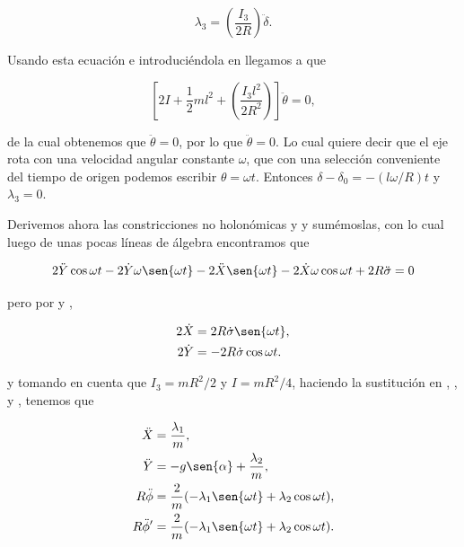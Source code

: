 \documentclass[a4paper,10pt]{article}
\numberwithin{equation}{section}
\begin{document}
\begin{equation}
 \lambda_3 = \left(\frac{I_3}{2R}\right)\ddot{\delta}.
\end{equation}

Usando esta ecuación e introduciéndola en  llegamos a que 

\begin{equation}
 \left[2I + \frac{1}{2}ml^2 + \left(\frac{I_3l^2}{2R^2}\right) \right]\ddot{\theta} = 0,
\end{equation}

de la cual obtenemos que $\ddot{\theta} = 0$, por lo que $\ddot{\theta}=0$. Lo cual 
quiere decir que el eje rota con una velocidad angular constante $\omega$, que con 
una selección conveniente del tiempo de origen podemos escribir $\theta = \omega t$. Entonces 
$\delta - \delta_0 = - (l\omega/R)t$ y $\lambda_3 = 0$. 

\vspace{.3cm}

Derivemos ahora las constricciones no holonómicas  y 
y sumémoslas, con lo cual luego de unas pocas líneas de álgebra encontramos que

\begin{equation}
 2\ddot{Y}\cos{\omega t} - 2\dot{Y}\omega\sen{\omega t} - 2\ddot{X}\sen{\omega t} 
 - 2\dot{X}\omega\cos{\omega t}  + 2R\ddot{\sigma} = 0
\end{equation}

pero por  y ,

\begin{align}
\label{eq:discosConstri4}
 2\dot{X} &= 2R\dot{\sigma}\sen{\omega t}, \\
\label{eq:discosConstri5}
 2\dot{Y} &= -2R\dot{\sigma}\cos{\omega t}. 
\end{align}

y tomando en cuenta que $I_3 = mR^2/2$ y $I = mR^2/4$, haciendo la sustitución en 
, ,  y ,
tenemos que 

\begin{align}
 \label{eq:1lagrange6}
 \ddot{X} &= \frac{\lambda_1}{m}, \\
 \label{eq:1lagrange7}
 \ddot{Y} &= - g\sen{\alpha} + \frac{\lambda_2}{m}, \\
 \label{eq:1lagrange8}
 R\ddot{\phi} &= \frac{2}{m}(-\lambda_1 \sen{\omega t} + \lambda_2 \cos{\omega t}), \\
 \label{eq:1lagrange9}
 R\ddot{\phi}' &= \frac{2}{m}(-\lambda_1 \sen{\omega t} + \lambda_2 \cos{\omega t}).
\end{align}
\end{document}
